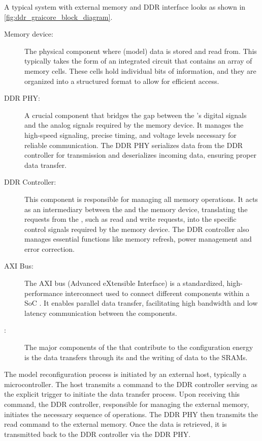 A typical system with external memory and DDR interface looks as shown in \cref{fig:ddr_graicore_block_diagram}.
\begin{description}
    \item[Memory device:] 
    The physical component where (model) data is stored and read from.
    This typically takes the form of an integrated circuit that contains an array of memory cells.
    These cells hold individual bits of information, and they are organized into a structured format to allow for efficient access.
    \item[DDR PHY:] 
    A crucial component that bridges the gap between the \graicore{}'s digital signals and the analog signals required by the memory device.
    It manages the high-speed signaling, precise timing, and voltage levels necessary for reliable communication.
    The DDR PHY serializes data from the DDR controller for transmission and deserializes incoming data, ensuring proper data transfer.
    \item[DDR Controller:] 
    This component is responsible for managing all memory operations.
    It acts as an intermediary between the \graicore{} and the memory device, translating the requests from the \graicore{}, such as read and write requests, into the specific control signals required by the memory device.
    The DDR controller also manages essential functions like memory refresh, power management and error correction.
    \item[AXI Bus:] 
    The AXI bus (Advanced eXtensible Interface) is a standardized, high-performance interconnect used to connect different components within a SoC \cite{ARM_AXI_Specification}.
    It enables parallel data transfer, facilitating high bandwidth and low latency communication between the components.
    \item[\graicore{}:] 
    The major components of the \graicore{} that contribute to the configuration energy is the data transfers through its \confignoc{} and the writing of data to the SRAMs.
\end{description}

The model reconfiguration process is initiated by an external host, typically a microcontroller.
The host transmits a command to the DDR controller serving as the explicit trigger to initiate the data transfer process.
Upon receiving this command, the DDR controller, responsible for managing the external memory, initiates the necessary sequence of operations.
The DDR PHY then transmits the read command to the external memory.
Once the data is retrieved, it is transmitted back to the DDR controller via the DDR PHY.


